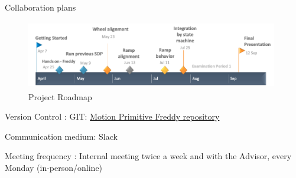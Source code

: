 \documentclass{beamer}
\begin{document}
\begin{frame}{Collaboration plans}
\begin{figure}[H]
            \centering
            \includegraphics[width=11cm  , height= 3cm]{roadmap.png}
            \caption{Project Roadmap}
            \label{fig:roadmap}
        \end{figure}
Version Control : GIT: \href{https://github.com/HBRS-SDP/ss22-motion-primitive-freddy}{Motion Primitive Freddy repository} 

Communication medium: Slack

Meeting frequency :  Internal meeting twice a week and with the Advisor, every Monday (in-person/online)

\end{frame}
\end{document}
